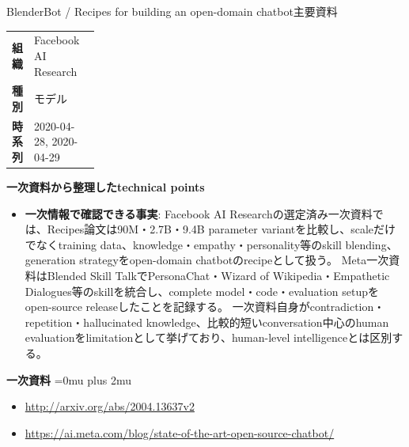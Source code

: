 \begin{technicalnote}{BlenderBot / Recipes for building an open-domain chatbot}{主要資料}
\begingroup
\begin{tabularx}{\linewidth}{@{}>{\bfseries}p{0.22\linewidth}X@{}}
組織 & Facebook AI Research \\
種別 & モデル \\
時系列 & 2020-04-28, 2020-04-29 \\
\end{tabularx}
\smallskip
{\bfseries 一次資料から整理したtechnical points}
\begin{itemize}[leftmargin=1.5em,itemsep=0.35em]
\item \textbf{一次情報で確認できる事実}: Facebook AI Researchの選定済み一次資料では、Recipes論文は90M・2.7B・9.4B parameter variantを比較し、scaleだけでなくtraining data、knowledge・empathy・personality等のskill blending、generation strategyをopen-domain chatbotのrecipeとして扱う。 Meta一次資料はBlended Skill TalkでPersonaChat・Wizard of Wikipedia・Empathetic Dialogues等のskillを統合し、complete model・code・evaluation setupをopen-source releaseしたことを記録する。 一次資料自身がcontradiction・repetition・hallucinated knowledge、比較的短いconversation中心のhuman evaluationをlimitationとして挙げており、human-level intelligenceとは区別する。
\end{itemize}
\begin{minipage}{\linewidth}
\begin{samepage}
{\bfseries 一次資料}
\begingroup\sloppy
\Urlmuskip=0mu plus 2mu\relax
\begin{itemize}[leftmargin=1.5em,itemsep=0.25em]
\item {\scriptsize\url{http://arxiv.org/abs/2004.13637v2}}
\item {\scriptsize\url{https://ai.meta.com/blog/state-of-the-art-open-source-chatbot/}}
\end{itemize}
\endgroup
\end{samepage}
\end{minipage}
\endgroup
\end{technicalnote}
\medskip
